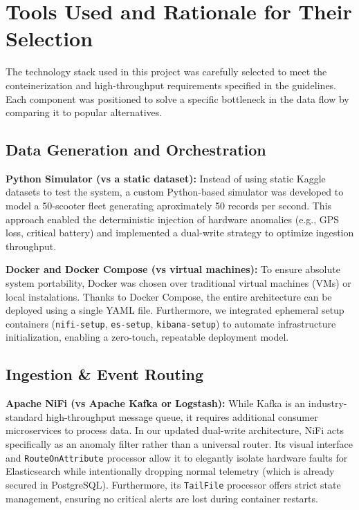 \documentclass[conference]{IEEEtran}
\begin{document}
\section{Tools Used and Rationale for Their Selection}

The technology stack used in this project was carefully selected to meet the conteinerization and high-throughput requirements specified in the guidelines. Each component was positioned to solve a specific bottleneck in the data flow by comparing it to popular alternatives.

\subsection{Data Generation and Orchestration}
\textbf{Python Simulator (vs a static dataset):} Instead of using static Kaggle datasets to test the system, a custom Python-based simulator was developed to model a 50-scooter fleet generating aproximately 50 records per second. This approach enabled the deterministic injection of hardware anomalies (e.g., GPS loss, critical battery) and implemented a dual-write strategy to optimize ingestion throughput.

\textbf{Docker and Docker Compose (vs virtual machines):} To ensure absolute system portability, Docker was chosen over traditional virtual machines (VMs) or local instalations. Thanks to Docker Compose, the entire architecture can be deployed using a single YAML file. Furthermore, we integrated ephemeral setup containers (\texttt{nifi-setup}, \texttt{es-setup}, \texttt{kibana-setup}) to automate infrastructure initialization, enabling a zero-touch, repeatable deployment model.

\subsection{Ingestion \& Event Routing}
\textbf{Apache NiFi (vs Apache Kafka or Logstash):} While Kafka is an industry-standard high-throughput message queue, it requires additional consumer microservices to process data. In our updated dual-write architecture, NiFi acts specifically as an anomaly filter rather than a universal router. Its visual interface and \texttt{RouteOnAttribute} processor allow it to elegantly isolate hardware faults for Elasticsearch while intentionally dropping normal telemetry (which is already secured in PostgreSQL). Furthermore, its \texttt{TailFile} processor offers strict state management, ensuring no critical alerts are lost during container restarts.
\end{document}
